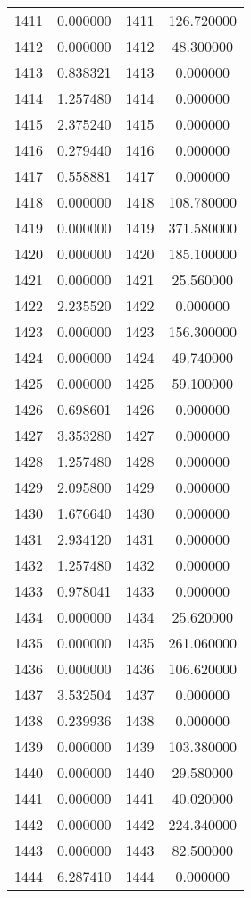 \documentclass[12pt]{article}
\begin{document}
\begin{longtable}{@{}cccc@{}}
1411 & 0.000000 & 1411 & 126.720000 \\
1412 & 0.000000 & 1412 & 48.300000 \\
1413 & 0.838321 & 1413 & 0.000000 \\
1414 & 1.257480 & 1414 & 0.000000 \\
1415 & 2.375240 & 1415 & 0.000000 \\
1416 & 0.279440 & 1416 & 0.000000 \\
1417 & 0.558881 & 1417 & 0.000000 \\
1418 & 0.000000 & 1418 & 108.780000 \\
1419 & 0.000000 & 1419 & 371.580000 \\
1420 & 0.000000 & 1420 & 185.100000 \\
1421 & 0.000000 & 1421 & 25.560000 \\
1422 & 2.235520 & 1422 & 0.000000 \\
1423 & 0.000000 & 1423 & 156.300000 \\
1424 & 0.000000 & 1424 & 49.740000 \\
1425 & 0.000000 & 1425 & 59.100000 \\
1426 & 0.698601 & 1426 & 0.000000 \\
1427 & 3.353280 & 1427 & 0.000000 \\
1428 & 1.257480 & 1428 & 0.000000 \\
1429 & 2.095800 & 1429 & 0.000000 \\
1430 & 1.676640 & 1430 & 0.000000 \\
1431 & 2.934120 & 1431 & 0.000000 \\
1432 & 1.257480 & 1432 & 0.000000 \\
1433 & 0.978041 & 1433 & 0.000000 \\
1434 & 0.000000 & 1434 & 25.620000 \\
1435 & 0.000000 & 1435 & 261.060000 \\
1436 & 0.000000 & 1436 & 106.620000 \\
1437 & 3.532504 & 1437 & 0.000000 \\
1438 & 0.239936 & 1438 & 0.000000 \\
1439 & 0.000000 & 1439 & 103.380000 \\
1440 & 0.000000 & 1440 & 29.580000 \\
1441 & 0.000000 & 1441 & 40.020000 \\
1442 & 0.000000 & 1442 & 224.340000 \\
1443 & 0.000000 & 1443 & 82.500000 \\
1444 & 6.287410 & 1444 & 0.000000 \\

\end{longtable}
\end{document}
